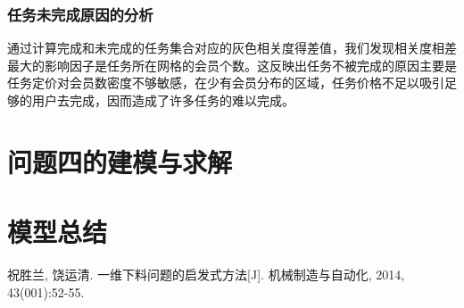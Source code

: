 \documentclass[withoutpreface,bwprint]{cumcmthesis} %
\begin{document}
\subsubsection{任务未完成原因的分析}
通过计算完成和未完成的任务集合对应的灰色相关度得差值，我们发现相关度相差最大的影响因子是任务所在网格的会员个数。这反映出任务不被完成的原因主要是任务定价对会员数密度不够敏感，在少有会员分布的区域，任务价格不足以吸引足够的用户去完成，因而造成了许多任务的难以完成。


\section{问题四的建模与求解}

\section{模型总结}

\begin{thebibliography}{9}%
    祝胜兰, 饶运清. 一维下料问题的启发式方法[J]. 机械制造与自动化, 2014, 43(001):52-55.
\end{thebibliography}

\begin{appendices}
\end{appendices}
\end{document}
